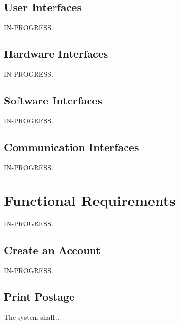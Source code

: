 \documentclass{scrreprt}
\begin{document}
\subsection{User Interfaces}

IN-PROGRESS.

\subsection{Hardware Interfaces}

IN-PROGRESS.

\subsection{Software Interfaces}

IN-PROGRESS.

\subsection{Communication Interfaces}

IN-PROGRESS.

\section{Functional Requirements}

IN-PROGRESS.

\subsection{Create an Account}

IN-PROGRESS.

\subsection{Print Postage}

The system shall...
\end{document}
